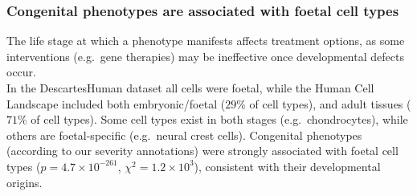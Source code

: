 \documentclass[
]{article}
\begin{document}
\begin{figure}[H]
{}

\caption{\label{fig-celltype-severity-dot}}

\end{figure}%

\subsubsection{Congenital phenotypes are associated with foetal cell
types}\label{congenital-phenotypes-are-associated-with-foetal-cell-types}

The life stage at which a phenotype manifests affects treatment options,
as some interventions (e.g.~gene therapies) may be ineffective once
developmental defects occur.\\
In the DescartesHuman dataset all cells were foetal, while the Human
Cell Landscape included both embryonic/foetal (\(29\)\% of cell types),
and adult tissues (\(71\)\% of cell types). Some cell types exist in
both stages (e.g.~chondrocytes), while others are foetal-specific
(e.g.~neural crest cells). Congenital phenotypes (according to our
severity annotations) were strongly associated with foetal cell types
(\(p=\)\(4.7 \times 10^{-261}\), \(\chi^2=\)\(1.2 \times 10^{3}\)),
consistent with their developmental origins.
\end{document}

